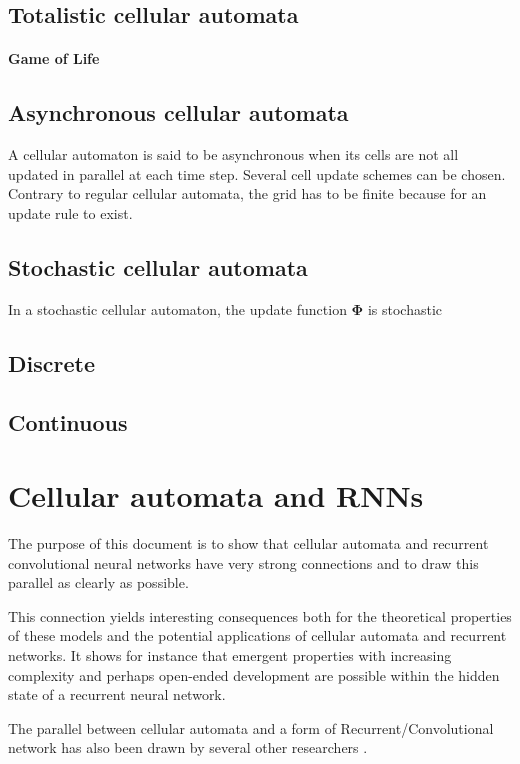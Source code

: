 \subsection{Totalistic cellular automata}

\paragraph{Game of Life}

\subsection{Asynchronous cellular automata}
A cellular automaton is said to be asynchronous when its cells are not all
updated in parallel at each time step. Several cell update schemes can
be chosen. Contrary to regular cellular automata, the grid has to be finite
because for an update rule to exist.

\subsection{Stochastic cellular automata}
In a stochastic cellular automaton, the update function $\boldsymbol{\Phi}$ is stochastic

\subsection{Discrete}
\subsection{Continuous}

\section{Cellular automata and RNNs}
The purpose of this document is to show that cellular automata and recurrent
convolutional neural networks have very strong connections and to draw this
parallel as clearly as possible.

This connection yields interesting consequences both for the theoretical
properties of these models and the potential applications of cellular automata
and recurrent networks. It shows for instance that emergent properties with
increasing complexity and perhaps open-ended development are possible within the
hidden state of a recurrent neural network.

The parallel between cellular automata and a form of Recurrent/Convolutional
network has also been drawn by several other researchers
\parencite{wulffLearningCellularAutomaton1993,
  gilpinCellularAutomataConvolutional2018,
  mordvintsevGrowingNeuralCellular2020}.

